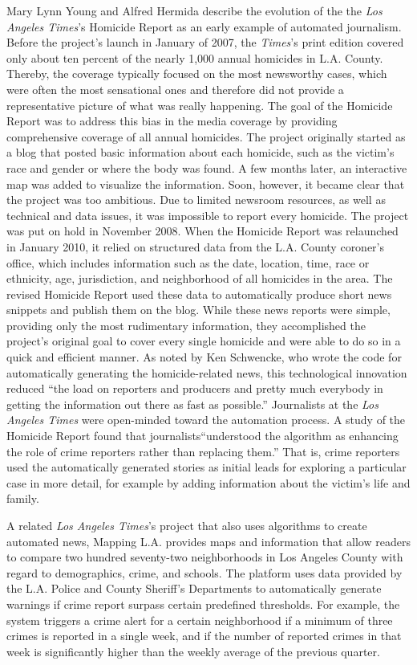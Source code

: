 \documentclass[notoc, symmetric, nobib, nols]{towcenter-book}
\begin{document}
Mary Lynn Young and Alfred Hermida describe the evolution of the the \textit{Los Angeles Times}’s Homicide Report as an early example of automated journalism.\cite{young15} Before the project’s launch in January of 2007, the \textit{Times}’s print edition covered only about ten percent of the nearly 1,000 annual homicides in L.A. County. Thereby, the coverage typically focused on the most newsworthy cases, which were often the most sensational ones and therefore did not provide a representative picture of what was really happening. The goal of the Homicide Report was to address this bias in the media coverage by providing comprehensive coverage of all annual homicides. The project originally started as a blog that posted basic information about each homicide, such as the victim’s race and gender or where the body was found. A few months later, an interactive map was added to visualize the information. Soon, however, it became clear that the project was too ambitious. Due to limited newsroom resources, as well as technical and data issues, it was impossible to report every homicide. The project was put on hold in November 2008. When the Homicide Report was relaunched in January 2010, it relied on structured data from the L.A. County coroner’s office, which includes information such as the date, location, time, race or ethnicity, age, jurisdiction, and neighborhood of all homicides in the area. The revised Homicide Report used these data to automatically produce short news snippets and publish them on the blog. While these news reports were simple, providing only the most rudimentary information, they accomplished the project’s original goal to cover every single homicide and were able to do so in a quick and efficient manner. As noted by Ken Schwencke, who wrote the code for automatically generating the homicide-related news, this technological innovation reduced ``the load on reporters and producers and pretty much everybody in getting the information out there as fast as possible.''\cite{young15} Journalists at the \textit{Los Angeles Times} were open-minded toward the automation process. A study of the Homicide Report found that journalists``understood the algorithm as enhancing the role of crime reporters rather than replacing them.''\cite{young15} That is, crime reporters used the automatically generated stories as initial leads for exploring a particular case in more detail, for example by adding information about the victim’s life and family. 

A related \textit{Los Angeles Times}’s project that also uses algorithms to create automated news, Mapping L.A. provides maps and information that allow readers to compare two hundred seventy-two neighborhoods in Los Angeles County with regard to demographics, crime, and schools. The platform uses data provided by the L.A. Police and County Sheriff’s Departments to automatically generate warnings if crime report surpass certain predefined thresholds. For example, the system triggers a crime alert for a certain neighborhood if a minimum of three crimes is reported in a single week, and if the number of reported crimes in that week is significantly higher than the weekly average of the previous quarter.
\end{document}
